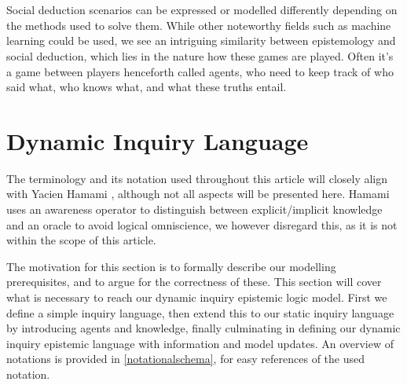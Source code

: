 \\\\

Social deduction scenarios can be expressed or modelled differently depending
on the methods used to solve them. While other noteworthy fields such as
machine learning could be used, we see an intriguing similarity between
epistemology and social deduction, which lies in the nature how these games are
played. Often it's a game between players henceforth called agents, who need to keep track of
who said what, who knows what, and what these truths entail.

\section{Dynamic Inquiry Language}
The terminology and its notation used throughout this article will closely
align with Yacien Hamami \cite{delimi}, although not all aspects will be
presented here. Hamami uses an awareness operator to distinguish between
explicit/implicit knowledge and an oracle to avoid logical omniscience, we
however disregard this, as it is not within the scope of this article.

The motivation for this section is to formally describe our modelling
prerequisites, and to argue for the correctness of these. This section will
cover what is necessary to reach our dynamic inquiry epistemic logic model.
First we define a simple inquiry language, then extend this to our static
inquiry language by introducing agents and knowledge, finally culminating in
defining our dynamic inquiry epistemic language with information and model
updates. An overview of notations is provided in \cref{notationalschema}, for
easy references of the used notation.


